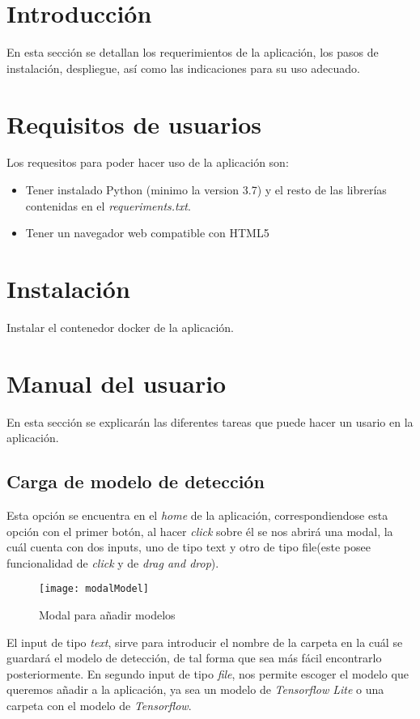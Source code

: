 
\section{Introducción}
En esta sección se detallan los requerimientos de la aplicación, los pasos de instalación, despliegue, así como las indicaciones para su uso adecuado.
\section{Requisitos de usuarios}
Los requesitos para poder hacer uso de la aplicación son:
\begin{itemize}
    \item Tener instalado Python (minimo la version 3.7) y el resto de las librerías contenidas en el \textit{requeriments.txt}.
    \item Tener un navegador web compatible con HTML5 
\end{itemize}

\section{Instalación}
Instalar el contenedor docker de la aplicación.

\section{Manual del usuario}
En esta sección se explicarán las diferentes tareas que puede hacer un usario en la aplicación.
\subsection{Carga de modelo de detección}
Esta opción se encuentra en el \textit{home} de la aplicación, correspondiendose esta opción con el primer botón, al hacer \textit{click} sobre él se nos abrirá una modal, la cuál cuenta con dos inputs, uno de tipo text y otro de tipo file(este posee funcionalidad de \textit{click} y de \textit{drag and drop}).
\begin{figure}[!h]
    \centering
    \texttt{[image: modalModel]}
    \caption{Modal para añadir modelos}\label{fig:modalModel}
\end{figure}
El input de tipo \textit{text}, sirve para introducir el nombre de la carpeta en la cuál se guardará el modelo de detección, de tal forma que sea más fácil encontrarlo posteriormente.
En segundo input de tipo \textit{file}, nos permite escoger el modelo que queremos añadir a la aplicación, ya sea un modelo de \textit{Tensorflow Lite} o una carpeta con el modelo de \textit{Tensorflow}.

